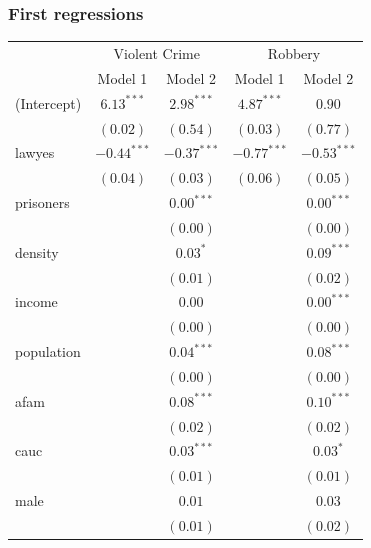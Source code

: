 \documentclass{beamer}
\newcommand{\1}{\mathbb{1}}
\begin{document}
\begin{frame}\frametitle{First regressions}
\begin{table}
\tiny
\begin{center}
\begin{tabular}{l c c c c }
\hline
  & \multicolumn{2}{c}{Violent Crime} & \multicolumn{2}{c}{Robbery}\\
 & Model 1 & Model 2 & Model 1 & Model 2 \\
\hline
(Intercept) & $6.13^{***}$  & $2.98^{***}$  & $4.87^{***}$  & $0.90$        \\
            & $(0.02)$      & $(0.54)$      & $(0.03)$      & $(0.77)$      \\
lawyes      & $-0.44^{***}$ & $-0.37^{***}$ & $-0.77^{***}$ & $-0.53^{***}$ \\
            & $(0.04)$      & $(0.03)$      & $(0.06)$      & $(0.05)$      \\
prisoners   &               & $0.00^{***}$  &               & $0.00^{***}$  \\
            &               & $(0.00)$      &               & $(0.00)$      \\
density     &               & $0.03^{*}$    &               & $0.09^{***}$  \\
            &               & $(0.01)$      &               & $(0.02)$      \\
income      &               & $0.00$        &               & $0.00^{***}$  \\
            &               & $(0.00)$      &               & $(0.00)$      \\
population  &               & $0.04^{***}$  &               & $0.08^{***}$  \\
            &               & $(0.00)$      &               & $(0.00)$      \\
afam        &               & $0.08^{***}$  &               & $0.10^{***}$  \\
            &               & $(0.02)$      &               & $(0.02)$      \\
cauc        &               & $0.03^{***}$  &               & $0.03^{*}$    \\
            &               & $(0.01)$      &               & $(0.01)$      \\
male        &               & $0.01$        &               & $0.03$        \\
            &               & $(0.01)$      &               & $(0.02)$      \\

\end{tabular}
\end{center}
\end{table}
\end{frame}
\end{document}
